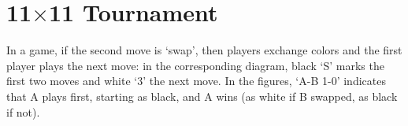 \documentclass{IOS-Book-Article}
\def\Ec{\mbox{\sc Ezo-CNN}}
\def\Mx{\mbox{\sc MoHex}}
\begin{document}

\section{11$\times$11 Tournament}
In a game, if the second move is `swap', then players
exchange colors and the first player plays the next move:
in the corresponding diagram, black `S' marks the first two moves
and white `3' the next move.
In the figures, `A-B 1-0' indicates that A plays first, starting as black, 
and A wins (as white if B swapped, as black if not).

\end{document}
